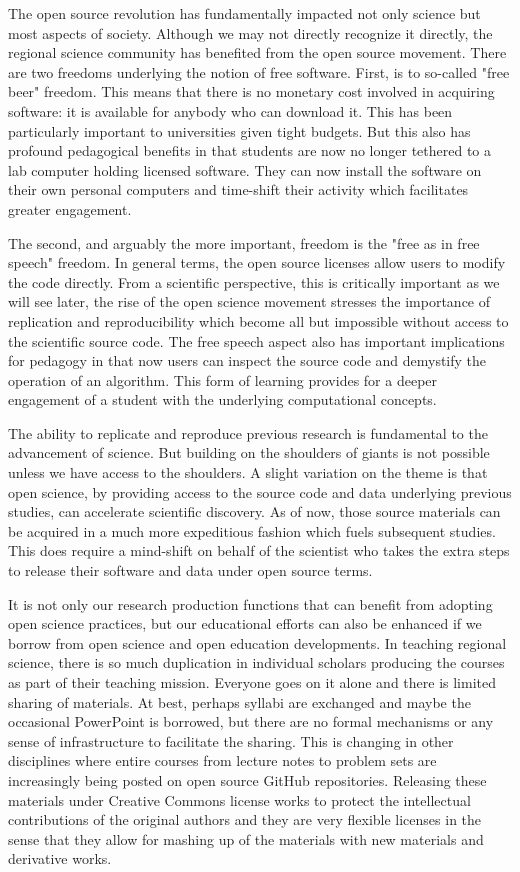 \documentclass[11pt]{article}
\begin{document}
The open source revolution has fundamentally impacted not only science but most
aspects of society. Although we may not directly recognize it directly, the regional
science community has benefited from the open source movement. There are two
freedoms underlying the notion of free software. First, is to so-called "free
beer" freedom. This means that there is no monetary cost involved in acquiring
software: it is available for anybody who can download it. This has been
particularly important to universities given tight budgets. But this also has
profound pedagogical benefits in that students are now no longer tethered to a
lab computer holding licensed software. They can now install the software on
their own personal computers and time-shift their activity which facilitates
greater engagement.

The second, and arguably the more important, freedom is the "free as in free
speech" freedom. In general terms, the open source licenses allow users to
modify the code directly. From a scientific perspective, this is critically
important as we will see later, the rise of the open science movement stresses
the importance of replication and reproducibility which become all but
impossible without access to the scientific source code. The free speech aspect
also has important implications for pedagogy in that now users can inspect the
source code and demystify the operation of an algorithm. This form of learning
provides for a deeper engagement of a student with the underlying computational
concepts.


The ability to replicate and reproduce previous research is fundamental to
the advancement of science. But building on the shoulders of giants is not
possible unless we have access to the shoulders. A slight variation on the
theme is that open science, by providing access to the source code and data
underlying previous studies, can accelerate scientific discovery. As of now, those
source materials can be acquired in a much more expeditious fashion which fuels
subsequent studies. This does require a mind-shift on behalf of
the scientist who takes the extra steps to release their software
and data under open source terms.

It is not only our research production functions that can benefit from adopting
open science practices, but our educational efforts can also be enhanced if we
borrow from open science and open education developments. In teaching regional
science, there is so much duplication in individual scholars producing the
courses as part of their teaching mission. Everyone goes on it alone and there
is limited sharing of materials. At best, perhaps syllabi are exchanged and
maybe the occasional PowerPoint is borrowed, but there are no formal mechanisms
or any sense of infrastructure to facilitate the sharing. This is changing in
other disciplines where entire courses from lecture notes to problem sets are
increasingly being posted on open source GitHub repositories. Releasing these
materials under Creative Commons license works to protect the intellectual
contributions of the original authors and they are very flexible licenses in
the sense that they allow for mashing up of the materials with new materials
and derivative works.
\end{document}
